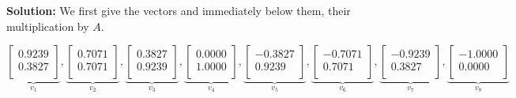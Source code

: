 \textbf{Solution:} We first give the vectors and immediately below them, their multiplication by $A$.

\begin{equation}
\underbrace{
\left[
\begin{array}{r}
0.9239 \\
0.3827 \\
\end{array}
\right]}_{v_1}, \underbrace{
\left[
\begin{array}{r}
0.7071 \\
0.7071 \\
\end{array}
\right]}_{v_2}, \underbrace{
\left[
\begin{array}{r}
0.3827 \\
0.9239 \\
\end{array}
\right]}_{v_3}, \underbrace{
\left[
\begin{array}{r}
0.0000 \\
1.0000 \\
\end{array}
\right]}_{v_4},  \underbrace{
\left[
\begin{array}{r}
-0.3827 \\
0.9239 \\
\end{array}
\right]}_{v_5},  \underbrace{
\left[
\begin{array}{r}
-0.7071 \\
0.7071 \\
\end{array}
\right]}_{v_6},  \underbrace{
\left[
\begin{array}{r}
-0.9239 \\
0.3827 \\
\end{array}
\right]}_{v_7}, \underbrace{
\left[
\begin{array}{r}
-1.0000 \\
0.0000 \\
\end{array}
\right]}_{v_8}
\end{equation}


